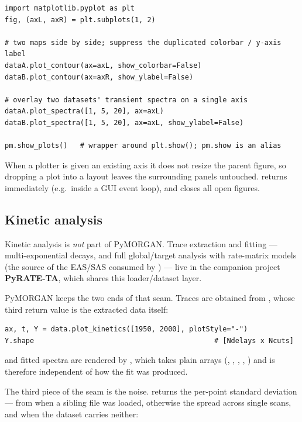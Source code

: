 \begin{lstlisting}
import matplotlib.pyplot as plt
fig, (axL, axR) = plt.subplots(1, 2)

# two maps side by side; suppress the duplicated colorbar / y-axis label
dataA.plot_contour(ax=axL, show_colorbar=False)
dataB.plot_contour(ax=axR, show_ylabel=False)

# overlay two datasets' transient spectra on a single axis
dataA.plot_spectra([1, 5, 20], ax=axL)
dataB.plot_spectra([1, 5, 20], ax=axL, show_ylabel=False)

pm.show_plots()   # wrapper around plt.show(); pm.show is an alias
\end{lstlisting}

When a plotter is given an existing axis it does not resize the parent figure,
so dropping a plot into a layout leaves the surrounding panels untouched.
 returns immediately (e.g.\ inside a GUI event
loop), and  closes all open figures.

\subsection{Kinetic analysis}\label{sec:analyse}
Kinetic analysis is \emph{not} part of PyMORGAN. Trace extraction and fitting
--- multi-exponential decays, and full global/target analysis with rate-matrix
models (the source of the EAS/SAS consumed by )
--- live in the companion project \textbf{PyRATE-TA}, which shares this
loader/dataset layer.

PyMORGAN keeps the two ends of that seam. Traces are obtained from
, whose third return value is the extracted data itself:

\begin{lstlisting}
ax, t, Y = data.plot_kinetics([1950, 2000], plotStyle="-")
Y.shape                                           # [Ndelays x Ncuts]
\end{lstlisting}

and fitted spectra are rendered by , which takes
plain arrays (, , , ,
) and is therefore independent of how the fit was produced.

The third piece of the seam is the noise. 
returns the per-point standard deviation --- from  when a sibling
 file was loaded, otherwise the spread across single scans, and
 when the dataset carries neither:


